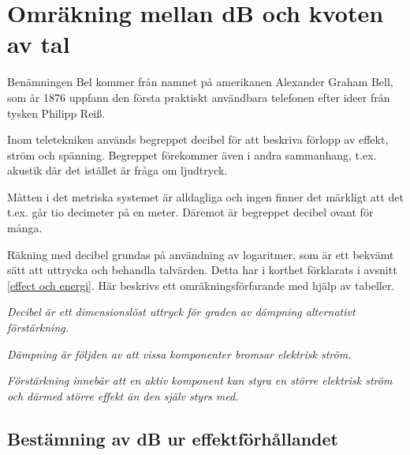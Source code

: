 \chapter{Omräkning mellan dB och kvoten av tal}
\label{decibel}

Benämningen Bel kommer från namnet på amerikanen Alexander Graham
Bell, som år 1876 uppfann den första praktiskt användbara telefonen
efter ideer från tysken Philipp Reiß.

Inom teletekniken används begreppet decibel för att beskriva förlopp
av effekt, ström och spänning.  Begreppet förekommer även i andra
sammanhang, t.ex. akustik där det istället är fråga om ljudtryck.

Måtten i det metriska systemet är alldagliga och ingen finner det
märkligt att det t.ex. går tio decimeter på en meter. Däremot är
begreppet decibel ovant för många.

Räkning med decibel grundas på användning av logaritmer, som är ett
bekvämt sätt att uttrycka och behandla talvärden.  Detta har i
korthet förklarats i avsnitt \ref{effect och energi}.  Här beskrivs ett
omräkningsförfarande med hjälp av tabeller.

\emph{Decibel är ett dimensionslöst uttryck för graden av dämpning
  alternativt förstärkning.}

\emph{Dämpning är följden av att vissa komponenter bromsar elektrisk
  ström.}

\emph{Förstärkning innebär att en aktiv komponent kan styra en större
  elektrisk ström och därmed större effekt än den själv styrs med.}

\section{Bestämning av dB ur effektförhållandet}

